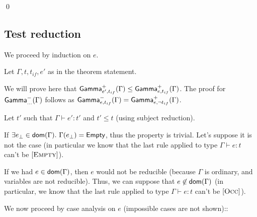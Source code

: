 \documentclass[a4paper]{article}
\theoremstyle{definition}
\begin{document}
        \qed
    
        \subsection{Test reduction}
    
        We proceed by induction on $e$.
    
        Let $\Gamma,t,t_{if},e'$ as in the theorem statement.
        
        We will prove here that $\textsf{Gamma}^{+}_{e',t_{if}}(\Gamma) \leq \textsf{Gamma}^{+}_{e,t_{if}}(\Gamma)$.
        The proof for $\textsf{Gamma}^{-}_{\dots}(\Gamma)$ follows as $\textsf{Gamma}^{-}_{e,t_{if}}(\Gamma)=\textsf{Gamma}^{+}_{e,\neg t_{if}}(\Gamma)$.
    
        Let $t'$ such that $\Gamma \vdash e':t'$ and $t'\leq t$ (using subject reduction).
    
        If $\exists e_{\bot} \in \dom\Gamma.\ \Gamma(e_{\bot}) = \Empty$, thus the property is trivial.
        Let's suppose it is not the case (in particular we know that the last rule applied to type $\Gamma \vdash e:t$ can't be $[\textsc{Empty}]$).
    
        If we had $e\in\textsf{dom}(\Gamma)$, then $e$ would not be reducible (because $\Gamma$ is ordinary, and variables are not reducible).
        Thus, we can suppose that $e\not\in\textsf{dom}(\Gamma)$ (in particular, we know that the last rule applied to type $\Gamma \vdash e:t$ can't be $[\textsc{Occ}]$).
    
        We now proceed by case analysis on $e$ (impossible cases are not shown)::
    
\end{document}
